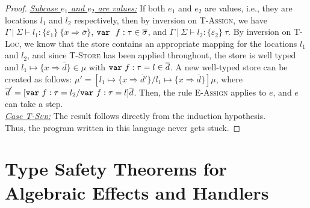 \begin{proof}
\underline{\textit{Subcase $e_1$ and $e_2$ are values:}} If both $e_1$ and $e_2$ are values, i.e., they are locations $l_1$ and $l_2$ respectively, then by inversion on \textsc{T-Assign}, we have $\Gamma~|~\Sigma \vdash l_1 : \{ \varepsilon_1 \}~\{ x \Rightarrow \overline{\sigma} \}$, $\mathtt{var}~~ f : \tau \in \overline{\sigma}$, and $\Gamma~|~\Sigma \vdash l_2 : \{ \varepsilon_2 \}~\tau$. By inversion on \textsc{T-Loc}, we know that the store contains an appropriate mapping for the locations $l_1$ and $l_2$, and since \textsc{T-Store} has been applied throughout, the store is well typed and $l_1 \mapsto \{ x \Rightarrow \overline{d} \} \in \mu$ with $\mathtt{var}~ f : \tau = l \in \overline{d}$. A new well-typed store can be created as follows: $\mu' = [l_1 \mapsto \{ x \Rightarrow \overline{d}' \}/l_1 \mapsto \{ x \Rightarrow \overline{d} \}]\mu$, where $\overline{d}' = [\mathtt{var}~ f : \tau = l_2/\mathtt{var}~ f : \tau = l]\overline{d}$. Then, the rule \textsc{E-Assign} applies to $e$, and $e$ can take a step.
\\

\noindent\underline{\textit{Case \textsc{T-Sub}:}}
The result follows directly from the induction hypothesis.
\\

\noindent Thus, the program written in this language never gets stuck.
\end{proof}


\chapter{Type Safety Theorems for Algebraic Effects and Handlers}
\label{appendix-alg}
